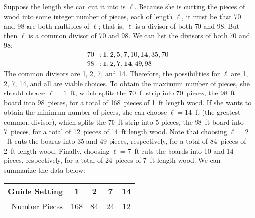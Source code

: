 \documentclass[11pt,letterpaper]{article}
\begin{document}
\sol Suppose the length she can cut it into is $\ell$. Because she is cutting the pieces of wood into some integer number of pieces, each of length $\ell$, it must be that 70 and 98 are both multiples of $\ell$; that is, $\ell$ is a divisor of both 70 and 98. But then $\ell$ is a common divisor of 70 and 98. We can list the divisors of both 70 and 98:
	\[
	\begin{aligned}
	70&\colon \mathbf{1}, \mathbf{2}, 5, \mathbf{7}, 10, \mathbf{14}, 35, 70 \\
	98&\colon \mathbf{1}, \mathbf{2}, \mathbf{7}, \mathbf{14}, 49, 98
	\end{aligned} 
	\]
The common divisors are 1, 2, 7, and 14. Therefore, the possibilities for $\ell$ are 1, 2, 7, 14, and all are viable choices. To obtain the maximum number of pieces, she should choose $\ell= 1$~ft, which splits the 70~ft strip into 70~pieces, the 98~ft board into 98~pieces, for a total of 168~pieces of 1~ft length wood. If she wants to obtain the minimum number of pieces, she can choose $\ell= 14$~ft (the greatest common divisor), which splits the 70~ft strip into 5 pieces, the 98~ft board into 7~pieces, for a total of 12~pieces of 14~ft length wood. Note that choosing $\ell= 2$~ft cuts the boards into 35 and 49 pieces, respectively, for a total of 84~pieces of 2~ft length wood. Finally, choosing $\ell= 7$~ft cuts the boards into 10 and 14 pieces, respectively, for a total of 24~pieces of 7~ft length wood. We can summarize the data below: \par
	\begin{table}[h]
	\centering
	\begin{tabular}{r||c|c|c|c}
	Guide Setting & 1 & 2 & 7 & 14 \\ \hline
	Number Pieces & 168 & 84 & 24 & 12
	\end{tabular}
	\end{table}
\end{document}

